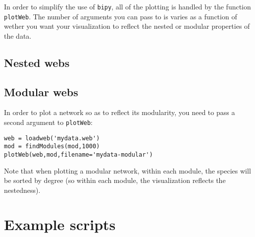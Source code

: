 \documentclass[10pt]{scrbook}
\begin{document}
In order to simplify the use of \texttt{bipy}, all of the plotting is handled by the function \texttt{plotWeb}. The number of arguments you can pass to is varies as a function of wether you want your visualization to reflect the nested or modular properties of the data.

\section{Nested webs}

\section{Modular webs}

In order to plot a network so as to reflect its modularity, you need to pass a second argument to \texttt{plotWeb}:

\begin{lstlisting}[caption=plotting a modular network]
web = loadweb('mydata.web')
mod = findModules(mod,1000)
plotWeb(web,mod,filename='mydata-modular')
\end{lstlisting}

Note that when plotting a modular network, within each module, the species will be sorted by degree (so within each module, the visualization reflects the nestedness).

\chapter{Example scripts\label{c:ex}}

%
%
\end{document}
